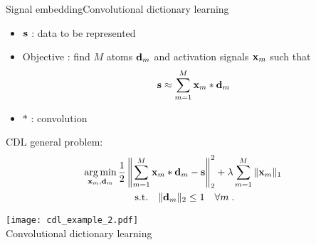 \begin{frame}{Signal embedding}{Convolutional dictionary learning}
\begin{minipage}[t]{0.45\linewidth}
    \begin{itemize}
        \item $\mathbf{s}$ : data to be represented
        \item Objective : find $M$ atoms $\mathbf{d}_m$ and activation signals $\mathbf{x}_m$ such that
        $$\mathbf{s} \approx \sum_{m=1}^{M}\mathbf{x}_m * \mathbf{d}_m$$
        \item $*$ : convolution
    \end{itemize}
    \pause[3]
    CDL general problem:
    \begin{gather*}\label{eq:cdl_baseform}
    \operatorname*{arg\,min}_{\mathbf{x}_m,\mathbf{d}_m} \frac{1}{2} \left\| \sum_{m=1}^{M} \mathbf{x}_{m} * \mathbf{d}_m - \mathbf{s} \right\|_2^2 + \lambda \sum_{m=1}^{M} \|\mathbf{x}_m \|_1 \ \\
        \text{s.t.}\quad \| \mathbf{d}_m\|_2 \leq 1 \quad \forall m \;. \nonumber
    \end{gather*}
\end{minipage}\hfill
\begin{minipage}[t]{0.4\linewidth}
    \centering
    \pause[2]
        \centering
        \texttt{[image: cdl\_example\_2.pdf]}\\
        \smallskip
        {\small Convolutional dictionary learning}
\end{minipage}

\end{frame}

